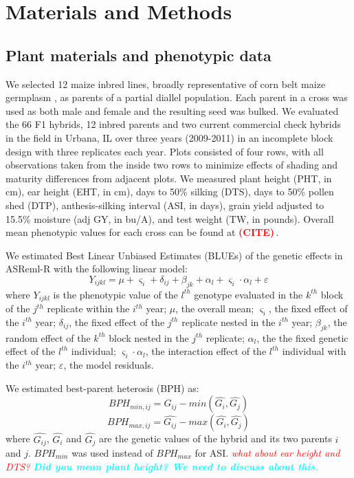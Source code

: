 \documentclass[9pt,twocolumn,twoside]{gsajnl}
\newcommand{\yang}[1]{\textcolor{cyan}{\emph{\bf  #1}} }
\newcommand{\citex}{\textcolor{red}{\bf (CITE)\,}}
\newcommand{\jri}[1]{\textcolor{red}{ \emph{ #1}} }
\begin{document}
\section*{Materials and Methods} 

\subsection*{Plant materials and phenotypic data}
We selected 12 maize inbred lines, broadly representative of corn belt maize germplasm \citep{mikel2006evolution}, as parents of a partial diallel population. 
Each parent in a cross was used as both male and female and the resulting seed was bulked. 
We evaluated the 66 F1 hybrids, 12 inbred parents and two current commercial check hybrids in the field in Urbana, IL over three years (2009-2011) in an incomplete block design with three replicates each year.  
Plots consisted of four rows, with all observations taken from the inside two rows to minimize effects of shading and maturity differences from adjacent plots.  
We measured plant height (PHT, in cm), ear height (EHT, in cm), days to 50\% silking (DTS), days to 50\% pollen shed (DTP), anthesis-silking interval (ASI, in days), grain yield adjusted to 15.5\% moisture (adj GY, in bu/A), and test weight (TW, in pounds). 
Overall mean phenotypic values for each cross can be found at \citex.

We estimated Best Linear Unbiased Estimates (BLUEs) of the genetic effects in ASReml-R \citep{gilmour2009asreml} with the following linear model: 
%
\[Y_{ijkl} = \mu + \varsigma_{i} + \delta_{ij} + \beta_{jk} + \alpha_{l} +  \varsigma_{i} \cdot \alpha_{l} + \varepsilon\]
%
where 
$Y_{ijkl}$ is the phenotypic value of the $l^{th}$ genotype evaluated in the $k^{th}$ block of the $j^{th}$ replicate within the $i^{th}$ year; 
$\mu$, the overall mean; 
$\varsigma_{i}$, the fixed effect of the $i^{th}$ year;
$\delta_{ij}$, the fixed effect of the $j^{th}$ replicate nested in the $i^{th}$ year; 
$\beta_{jk}$, the random effect of the $k^{th}$ block nested in the $j^{th}$ replicate; 
$\alpha_{l}$, the the fixed genetic effect  of the $l^{th}$ individual; 
$\varsigma_{i} \cdot \alpha_{l}$, the interaction effect of the $l^{th}$ individual with the $i^{th}$ year; 
$\varepsilon$, the model residuals. 

We estimated best-parent heterosis (BPH) as:
%
\[ BPH_{min,ij}=\hat{G_{ij}}-min(\hat{G_{i}} ,\hat{G_{j}}) \] 
\[ BPH_{max,ij}=\hat{G_{ij}}-max(\hat{G_{i}} ,\hat{G_{j}}) \]
%
where $\hat{G_{ij}}$, $\hat{G_{i}}$ and $\hat{G_{j}}$ are the genetic values of the hybrid and its two parents $i$ and $j$. $BPH_{min}$ was used instead of $BPH_{max}$ for ASI. \jri{what about ear height and DTS?} \yang{Did you mean plant height? We need to discuss about this.}
\end{document}

